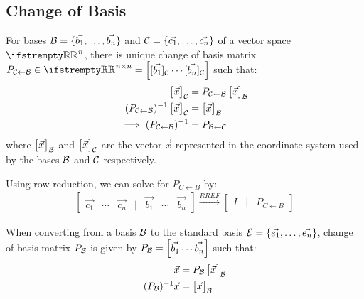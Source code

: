 \documentclass[12pt, a4paper]{article}
\begin{document}
\begin{multicols*}{3}
\subsection{Change of Basis}
For bases $\mathcal{B} = \{\vec{b_1},\ldots,\vec{b_n}\}$ and $\mathcal{C} = \{\vec{c_1},\ldots,\vec{c_n}\}$ of a vector space $\RR^n$, there is unique change of basis matrix $P_{\mcC{\leftarrow}\mcB} \in \RR^{n{\times}n} = \begin{bmatrix}[\vec{b_1}]_{\mcC} \cdots [\vec{b_n}]_{\mcC} \end{bmatrix}$ such that:
\begin{align*}
  \begin{bmatrix}\vec{x}\end{bmatrix}_{\mathcal{C}} &= P_{\mathcal{C}{\leftarrow}\mathcal{B}}\begin{bmatrix}\vec{x}\end{bmatrix}_{\mathcal{B}} \\
  (P_{\mathcal{C}{\leftarrow}\mathcal{B}})^{-1}\begin{bmatrix}\vec{x}\end{bmatrix}_{\mathcal{C}} &= \begin{bmatrix}\vec{x}\end{bmatrix}_{\mathcal{B}} \\ 
  \implies (P_{\mathcal{C}{\leftarrow}\mathcal{B}})^{-1} &= P_{\mathcal{B}{\leftarrow}\mathcal{C}}
\end{align*}
where $\begin{bmatrix}\vec{x}\end{bmatrix}_{\mathcal{B}}$ and $\begin{bmatrix}\vec{x}\end{bmatrix}_{\mathcal{C}}$ are the vector $\vec{x}$ represented in the coordinate system used by the bases $\mathcal{B}$ and $\mathcal{C}$ respectively.

Using row reduction, we can solve for ${P_{C{\leftarrow}B}}$ by:
\begin{align*}
  \begin{bmatrix}\vec{c_1} & \cdots & \vec{c_n} & | & \vec{b_1} & \cdots & \vec{b_n}\end{bmatrix} \xrightarrow{RREF} \begin{bmatrix}I & | & P_{C{\leftarrow}B}\end{bmatrix} 
\end{align*}

When converting from a basis $\mathcal{B}$ to the standard basis $\mathcal{E} = \{\vec{e_1},\ldots,\vec{e_n}\}$, change of basis matrix $P_{\mathcal{B}}$ is given by $P_{\mathcal{B}} =  \begin{bmatrix}\vec{b_1} \cdots \vec{b_n}\end{bmatrix}$ such that:
\begin{align*}
  \vec{x} &= P_{\mathcal{B}}\begin{bmatrix}\vec{x}\end{bmatrix}_{\mathcal{B}} \\
  (P_{\mathcal{B}})^{-1}\vec{x} &= \begin{bmatrix}\vec{x}\end{bmatrix}_{\mathcal{B}}
\end{align*}
\colbreak


\end{multicols*}
\end{document}
